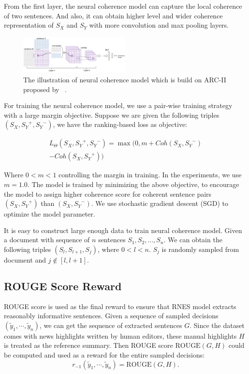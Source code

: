 \documentclass[letterpaper]{article} %
\begin{document}
	
	From the first layer, the neural coherence model can capture the local coherence of two sentences.  And also, it can obtain higher level and wider coherence representation of $S_X$ and $S_Y$ with more convolution and max pooling layers.
	
	\begin{figure}
		\includegraphics[width=0.5\textwidth]{./images/coherence.png}
		\caption{The illustration of neural coherence model which is build on ARC-II proposed by ~\cite{NIPS2014_hu}.}
		\label{coherence}
	\end{figure}
	
	
	For training the neural coherence model, we use a pair-wise training strategy with a large margin objective. 
	Suppose we are given the following triples $(S_X, {S_Y}^{+},{S_Y}^{-})$, we have the ranking-based loss as objective:
	
	\begin{equation}
	\begin{split}
	L_\Theta({S_X}, {S_Y}^+, {S_Y}^-) = 
	\max(0, m+Coh({S_X, {S_Y}^-})\\
	-Coh({S_X}, {S_Y}^+))
	\end{split}
	\end{equation}
	
	\noindent Where $0< m <1$ controlling the margin in training. In the experiments, we use $m = 1.0$. The model is trained by minimizing the above objective, to encourage the model to assign higher coherence score for coherent sentence pairs $(S_X, {S_Y}^+)$ than $({S_X}, {S_Y}^-)$. We use stochastic gradient descent (SGD) to optimize the model parameter.
	
	It is easy to construct large enough data to train neural coherence model. Given a document with sequence of $n$ sentences $S_1, S_2,...,S_n$. We can obtain the following triples $(S_l, S_{l+1}, S_j)$, where $0<l<n$. $S_j$ is randomly sampled from document and $j\notin[l,l+1]$.

	
	\subsection{ROUGE Score Reward}
	\label{rsr}
	ROUGE score is used as the final reward to ensure that RNES model extracts reasonably informative sentences. Given a sequence of sampled decisions $(\tilde{y}_1, \cdots, \tilde{y}_n)$, we can get the sequence of extracted sentences $G$. Since the dataset comes with news highlights written by human editors, these manual highlights $H$ is treated as the reference summary. Then ROUGE score $\text{ROUGE}(G, H)$ could be computed and used as a reward for the entire sampled decisions:
	\[ r_{-1}(\tilde{y}_1, \cdots, \tilde{y}_n) = \text{ROUGE}(G, H). \]
\end{document}
